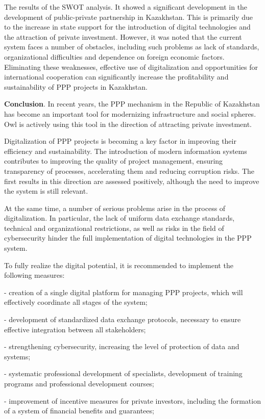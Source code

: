 The results of the SWOT analysis. It showed a significant development in
the development of public-private partnership in Kazakhstan. This is
primarily due to the increase in state support for the introduction of
digital technologies and the attraction of private investment. However,
it was noted that the current system faces a number of obstacles,
including such problems as lack of standards, organizational
difficulties and dependence on foreign economic factors. Eliminating
these weaknesses, effective use of digitalization and opportunities for
international cooperation can significantly increase the profitability
and sustainability of PPP projects in Kazakhstan.

{\bfseries Conclusion}. In recent years, the PPP mechanism in the Republic
of Kazakhstan has become an important tool for modernizing
infrastructure and social spheres. Owl is actively using this tool in
the direction of attracting private investment.

Digitalization of PPP projects is becoming a key factor in improving
their efficiency and sustainability. The introduction of modern
information systems contributes to improving the quality of project
management, ensuring transparency of processes, accelerating them and
reducing corruption risks. The first results in this direction are
assessed positively, although the need to improve the system is still
relevant.

At the same time, a number of serious problems arise in the process of
digitalization. In particular, the lack of uniform data exchange
standards, technical and organizational restrictions, as well as risks
in the field of cybersecurity hinder the full implementation of digital
technologies in the PPP system.

To fully realize the digital potential, it is recommended to implement
the following measures:

- creation of a single digital platform for managing PPP projects, which
will effectively coordinate all stages of the system;

- development of standardized data exchange protocols, necessary to
ensure effective integration between all stakeholders;

- strengthening cybersecurity, increasing the level of protection of
data and systems;

- systematic professional development of specialists, development of
training programs and professional development courses;

- improvement of incentive measures for private investors, including the
formation of a system of financial benefits and guarantees;

